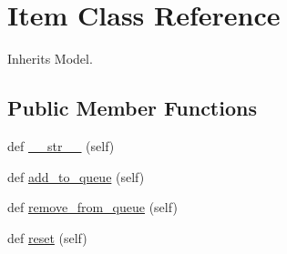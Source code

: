 \hypertarget{classdynamicfilterapp_1_1models_1_1_item}{}\section{Item Class Reference}
\label{classdynamicfilterapp_1_1models_1_1_item}


Inherits Model.

\subsection*{Public Member Functions}
\begin{DoxyCompactItemize}
\item 
def \mbox{\hyperlink{classdynamicfilterapp_1_1models_1_1_item_a23e8041ce1015febe4fdace3225714f9}{\+\_\+\+\_\+str\+\_\+\+\_\+}} (self)
\item 
def \mbox{\hyperlink{classdynamicfilterapp_1_1models_1_1_item_ac83cd255885b9a7b8852cd66fad6da53}{add\+\_\+to\+\_\+queue}} (self)
\item 
def \mbox{\hyperlink{classdynamicfilterapp_1_1models_1_1_item_a438b59c52d810e87114f98c1996d6272}{remove\+\_\+from\+\_\+queue}} (self)
\item 
def \mbox{\hyperlink{classdynamicfilterapp_1_1models_1_1_item_a51829b63adb24ac48d350dee60181002}{reset}} (self)
\end{DoxyCompactItemize}
